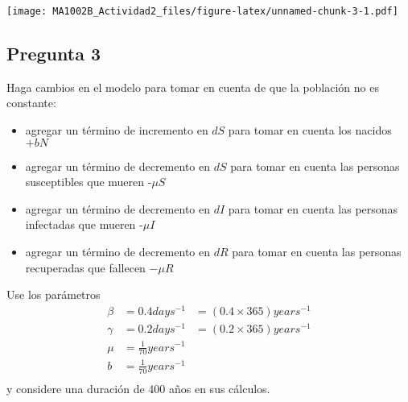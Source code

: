 \documentclass[
]{article}
\begin{document}
\texttt{[image: MA1002B\_Actividad2\_files/figure-latex/unnamed-chunk-3-1.pdf]}

\hypertarget{pregunta-3}{%
\subsection{Pregunta 3}\label{pregunta-3}}

Haga cambios en el modelo para tomar en cuenta de que la población no es
constante:

\begin{itemize}
\item
  agregar un término de incremento en \(dS\) para tomar en cuenta los
  nacidos \(+bN\)
\item
  agregar un término de decremento en \(dS\) para tomar en cuenta las
  personas susceptibles que mueren -\(\mu S\)
\item
  agregar un término de decremento en \(dI\) para tomar en cuenta las
  personas infectadas que mueren -\(\mu I\)
\item
  agregar un término de decremento en \(dR\) para tomar en cuenta las
  personas recuperadas que fallecen \(-\mu R\)
\end{itemize}

Use los parámetros \[
\begin{aligned}
\beta  &=  0.4 days^{-1} &= (0.4 \times 365) years^{-1}\\
\gamma &=  0.2 days^{-1} &= (0.2 \times 365) years^{-1}\\
\mu    &=  \frac{1}{70}years^{-1}\\
b     &=  \frac{1}{70}years^{-1}\\
\end{aligned}
\] y considere una duración de 400 años en sus cálculos.
\end{document}
